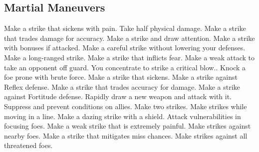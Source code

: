 \subsection{Martial Maneuvers}\label{Martial Maneuvers}
\begin{spelllist}
 Make a strike that sickens with pain.
 Take half physical damage.
 Make a strike that trades damage for accuracy.
 Make a strike and draw attention.
 Make a strike with bonuses if attacked.
 Make a careful strike without lowering your defenses.
 Make a long-ranged strike.
 Make a strike that inflicts fear.
 Make a weak attack to take an opponent off guard.
 You concentrate to strike a critical blow..
 Knock a foe prone with brute force.
 Make a strike that sickens.
 Make a strike against Reflex defense.
 Make a strike that trades accuracy for damage.
 Make a strike against Fortitude defense.
 Rapidly draw a new weapon and attack with it.
 Suppress and prevent conditions on allies.
 Make two strikes.
 Make strikes while moving in a line.
 Make a dazing strike with a shield.
 Attack vulnerabilities in focusing foes.
 Make a weak strike that is extremely painful.
 Make strikes against nearby foes.
 Make a strike that mitigates miss chances.
 Make strikes against all threatened foes.
\end{spelllist}



\small
